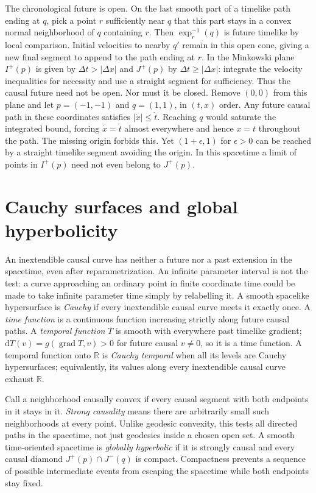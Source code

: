 The chronological future is open. On the last smooth part of a timelike path ending at $q$, pick a point $r$ sufficiently near $q$ that this part stays in a convex normal neighborhood of $q$ containing $r$. Then $\exp_r^{-1}(q)$ is future timelike by local comparison. Initial velocities to nearby $q'$ remain in this open cone, giving a new final segment to append to the path ending at $r$. In the Minkowski plane $I^+(p)$ is given by $\Delta t>|\Delta x|$ and $J^+(p)$ by $\Delta t\geq|\Delta x|$: integrate the velocity inequalities for necessity and use a straight segment for sufficiency. Thus the causal future need not be open. Nor must it be closed. Remove $(0,0)$ from this plane and let $p=(-1,-1)$ and $q=(1,1)$, in $(t,x)$ order. Any future causal path in these coordinates satisfies $|\dot x|\leq\dot t$. Reaching $q$ would saturate the integrated bound, forcing $\dot x=\dot t$ almost everywhere and hence $x=t$ throughout the path. The missing origin forbids this. Yet $(1+\epsilon,1)$ for $\epsilon>0$ can be reached by a straight timelike segment avoiding the origin. In this spacetime a limit of points in $I^+(p)$ need not even belong to $J^+(p)$.

\section{Cauchy surfaces and global hyperbolicity}

An inextendible causal curve has neither a future nor a past extension in the spacetime, even after reparametrization. An infinite parameter interval is not the test: a curve approaching an ordinary point in finite coordinate time could be made to take infinite parameter time simply by relabelling it. A smooth spacelike hypersurface is \emph{Cauchy} if every inextendible causal curve meets it exactly once. A \emph{time function} is a continuous function increasing strictly along future causal paths. A \emph{temporal function} $T$ is smooth with everywhere past timelike gradient; $\mathrm dT(v)=g(\operatorname{grad}T,v)>0$ for future causal $v\ne0$, so it is a time function. A temporal function onto $\mathbb R$ is \emph{Cauchy temporal} when all its levels are Cauchy hypersurfaces; equivalently, its values along every inextendible causal curve exhaust $\mathbb R$.

Call a neighborhood causally convex if every causal segment with both endpoints in it stays in it. \emph{Strong causality} means there are arbitrarily small such neighborhoods at every point. Unlike geodesic convexity, this tests all directed paths in the spacetime, not just geodesics inside a chosen open set. A smooth time-oriented spacetime is \emph{globally hyperbolic} if it is strongly causal and every causal diamond $J^+(p)\cap J^-(q)$ is compact. Compactness prevents a sequence of possible intermediate events from escaping the spacetime while both endpoints stay fixed.

